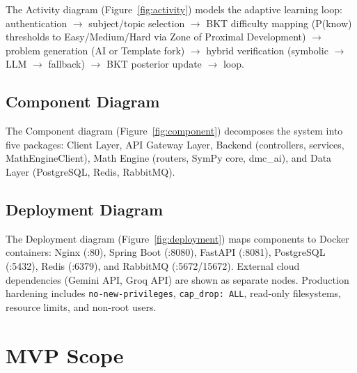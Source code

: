 The Activity diagram (Figure~\ref{fig:activity}) models the adaptive learning loop: authentication $\rightarrow$ subject/topic selection $\rightarrow$ BKT difficulty mapping (P(know) thresholds to Easy/Medium/Hard via Zone of Proximal Development) $\rightarrow$ problem generation (AI or Template fork) $\rightarrow$ hybrid verification (symbolic $\rightarrow$ LLM $\rightarrow$ fallback) $\rightarrow$ BKT posterior update $\rightarrow$ loop.

\subsection{Component Diagram}
\label{subsec:component}


The Component diagram (Figure~\ref{fig:component}) decomposes the system into five packages: Client Layer, API Gateway Layer, Backend (controllers, services, MathEngineClient), Math Engine (routers, SymPy core, dmc\_ai), and Data Layer (PostgreSQL, Redis, RabbitMQ).

\subsection{Deployment Diagram}
\label{subsec:deployment}


The Deployment diagram (Figure~\ref{fig:deployment}) maps components to Docker containers: Nginx (:80), Spring Boot (:8080), FastAPI (:8081), PostgreSQL (:5432), Redis (:6379), and RabbitMQ (:5672/15672). External cloud dependencies (Gemini API, Groq API) are shown as separate nodes. Production hardening includes \texttt{no-new-privileges}, \texttt{cap\_drop: ALL}, read-only filesystems, resource limits, and non-root users.


\section{MVP Scope}
\label{sec:mvp}

